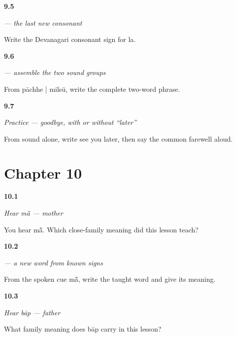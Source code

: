 \noindent\begin{minipage}[t]{\linewidth}
\raggedright
\hypertarget{review-MW-W07-la-write}{\textbf{9.5}} \emph{ — the last new consonant}\par
\small Write the Devanagari consonant sign for la.
\end{minipage}\par\medskip

\noindent\begin{minipage}[t]{\linewidth}
\raggedright
\hypertarget{review-MW-C07-read-later-build}{\textbf{9.6}} \emph{  — assemble the two sound groups}\par
\small From pāchhe | milsū, write the complete two-word phrase.
\end{minipage}\par\medskip

\noindent\begin{minipage}[t]{\linewidth}
\raggedright
\hypertarget{review-MW-C07-practice-later}{\textbf{9.7}} \emph{Practice — goodbye, with or without “later”}\par
\small From sound alone, write see you later, then say the common farewell aloud.
\end{minipage}\par\medskip

\section*{Chapter 10}

\noindent\begin{minipage}[t]{\linewidth}
\raggedright
\hypertarget{review-MW-C08-hear-maa-meaning}{\textbf{10.1}} \emph{Hear \emph{mā̃} — mother}\par
\small You hear mā̃. Which close-family meaning did this lesson teach?
\end{minipage}\par\medskip

\noindent\begin{minipage}[t]{\linewidth}
\raggedright
\hypertarget{review-MW-C08-maa-dictation}{\textbf{10.2}} \emph{ — a new word from known signs}\par
\small From the spoken cue mā̃, write the taught word and give its meaning.
\end{minipage}\par\medskip

\noindent\begin{minipage}[t]{\linewidth}
\raggedright
\hypertarget{review-MW-C08-hear-baap-meaning}{\textbf{10.3}} \emph{Hear \emph{bāp} — father}\par
\small What family meaning does bāp carry in this lesson?
\end{minipage}\par\medskip

